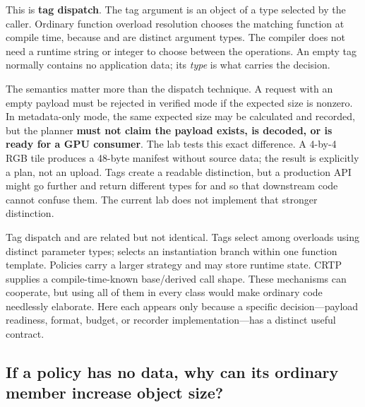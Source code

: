 This is \textbf{tag dispatch}. The tag argument is an object of a type selected by the caller. Ordinary function overload resolution chooses the matching function at compile time, because  and  are distinct argument types. The compiler does not need a runtime string or integer to choose between the operations. An empty tag normally contains no application data; its \emph{type} is what carries the decision.

The semantics matter more than the dispatch technique. A request with an empty payload must be rejected in verified mode if the expected size is nonzero. In metadata-only mode, the same expected size may be calculated and recorded, but the planner \textbf{must not claim the payload exists, is decoded, or is ready for a GPU consumer}. The lab tests this exact difference. A 4-by-4 RGB tile produces a 48-byte manifest without source data; the result is explicitly a plan, not an upload. Tags create a readable distinction, but a production API might go further and return different types for  and  so that downstream code cannot confuse them. The current lab does not implement that stronger distinction.

Tag dispatch and  are related but not identical. Tags select among overloads using distinct parameter types;  selects an instantiation branch within one function template. Policies carry a larger strategy and may store runtime state. CRTP supplies a compile-time-known base/derived call shape. These mechanisms can cooperate, but using all of them in every class would make ordinary code needlessly elaborate. Here each appears only because a specific decision---payload readiness, format, budget, or recorder implementation---has a distinct useful contract.

\subsection{If a policy has no data, why can its ordinary member increase object size?}\label{05-engine-i-ch005-if-a-policy-has-no-data-why-can-its-ordinary-member-increase-object-size}

